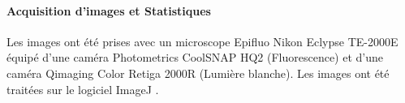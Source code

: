 	\begin{table}[h]
	\end{table} 
\FloatBarrier
	
\paragraph{Acquisition d'images et Statistiques}
\label{sec:ImagesStats}
	Les images ont été prises avec un microscope Epifluo Nikon Eclypse TE-2000E équipé d'une caméra Photometrics CoolSNAP HQ2 (Fluorescence) et d'une caméra Qimaging Color Retiga 2000R (Lumière blanche).
	Les images ont été traitées sur le logiciel ImageJ \cite{Schneider2012}.